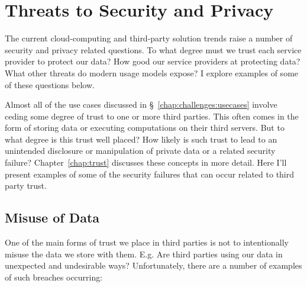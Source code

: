 \section{Threats to Security and Privacy}
\label{chap:challenges:threats}

The current cloud-computing and third-party solution trends raise a
number of security and privacy related questions. To what degree must
we trust each service provider to protect our data? How good our
service providers at protecting data? What other threats do modern
usage models expose? I explore examples of some of these questions
below.

Almost all of the use cases discussed in
\S~\ref{chap:challenges:usecases} involve ceding some degree of trust
to one or more third parties. This often comes in the form of storing
data or executing computations on their third servers. But to what
degree is this trust well placed? How likely is such trust to lead to
an unintended disclosure or manipulation of private data or a related
security failure? Chapter~\ref{chap:trust} discusses these concepts in
more detail. Here I'll present examples of some of the security
failures that can occur related to third party trust.

\subsection{Misuse of Data}

One of the main forms of trust we place in third parties is not to
intentionally misuse the data we store with them. E.g. Are third
parties using our data in unexpected and undesirable ways?
Unfortunately, there are a number of examples of such breaches
occurring:

